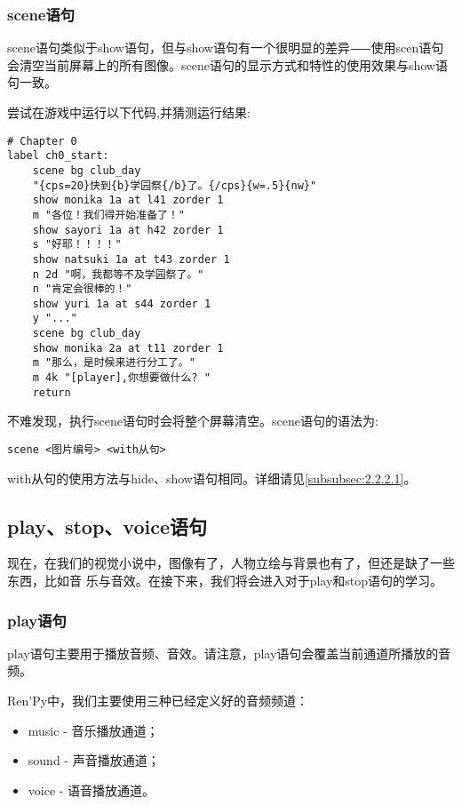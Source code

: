 \subsubsection{scene语句}
\label{subsubsec:2.2.2.3}

scene语句类似于show语句，但与show语句有一个很明显的差异⸺使用scen语句会清空当前屏幕上的所有图像。scene语句的显示方式和特性的使用效果与show语句一致。

尝试在游戏中运行以下代码,并猜测运行结果:
\begin{lstlisting}[caption=script-ch1.rpy]
# Chapter 0
label ch0_start:
    scene bg club_day
    "{cps=20}快到{b}学园祭{/b}了。{/cps}{w=.5}{nw}"
    show monika 1a at l41 zorder 1
    m "各位！我们得开始准备了！"
    show sayori 1a at h42 zorder 1
    s "好耶！！！！"
    show natsuki 1a at t43 zorder 1
    n 2d "啊，我都等不及学园祭了。"
    n "肯定会很棒的！"
    show yuri 1a at s44 zorder 1
    y "..."
    scene bg club_day
    show monika 2a at t11 zorder 1
    m "那么，是时候来进行分工了。"
    m 4k "[player],你想要做什么? "
    return
\end{lstlisting}

不难发现，执行scene语句时会将整个屏幕清空。scene语句的语法为:

\begin{lstlisting}[numbers=none]
scene <图片编号> <with从句>
\end{lstlisting}

with从句的使用方法与hide、show语句相同。详细请见\ref{subsubsec:2.2.2.1}。

\subsection{play、stop、voice语句}
现在，在我们的视觉小说中，图像有了，人物立绘与背景也有了，但还是缺了一些东西，比如音
乐与音效。在接下来，我们将会进入对于play和stop语句的学习。

\subsubsection{play语句}

play语句主要用于播放音频、音效。请注意，play语句会覆盖当前通道所播放的音频。

Ren'Py中，我们主要使用三种已经定义好的音频频道：

\begin{itemize}
    \item music - 音乐播放通道；
    \item sound - 声音播放通道；
    \item voice - 语音播放通道。 
\end{itemize}

